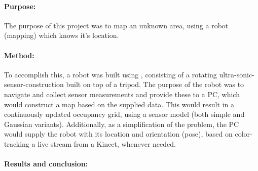 \paragraph{Purpose:}The purpose of this project was to map an unknown area, using a robot (mapping) which knows it's location.

\paragraph{Method:}To accomplish this, a robot was built using \legoms, consisting of a rotating ultra-sonic-sensor-construction built on top of a tripod.
The purpose of the robot was to navigate and collect sensor measurements and provide these to a PC, which would construct a map based on the supplied data.
This would result in a continuously updated occupancy grid, using a sensor model (both simple and Gaussian variants).
Additionally, as a simplification of the problem, the PC would supply the robot with its location and orientation (pose), based on color-tracking a live stream from a Kinect, whenever needed.

\paragraph{Results and conclusion:}
